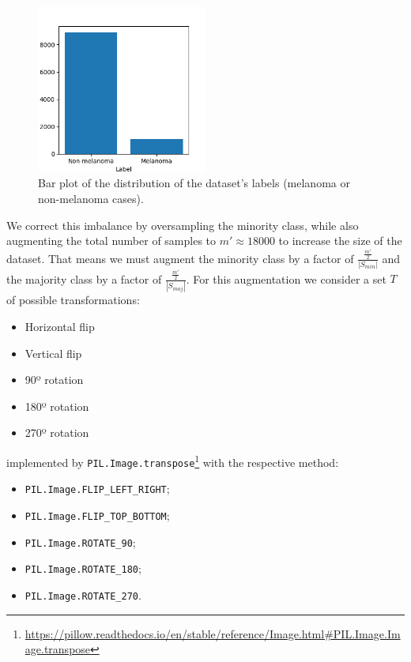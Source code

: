 \begin{figure}[ht]
    \centering
    \includegraphics[width=0.5\textwidth]{figs/data_barplot.png}
    \caption{Bar plot of the distribution of the dataset's labels (melanoma or non-melanoma cases).}
    \label{fig:classimbalance}
\end{figure}

We correct this imbalance by oversampling the minority class, while also augmenting the total number of samples to $m' \approx 18000$ to increase the size of the dataset. That means we must augment the minority class by a factor of $\frac{\frac{m'}{2}}{|S_{min}|}$ and the majority class by a factor of $\frac{\frac{m'}{2}}{|S_{maj}|}$. For this augmentation we consider a set $T$ of possible transformations:

\begin{itemize}
    \item Horizontal flip
    \item Vertical flip
    \item 90º rotation
    \item 180º rotation
    \item 270º rotation
\end{itemize}

implemented by \verb|PIL.Image.transpose|\footnote{\url{https://pillow.readthedocs.io/en/stable/reference/Image.html\#PIL.Image.Image.transpose}} with the respective method:

\begin{itemize}
    \item \verb|PIL.Image.FLIP_LEFT_RIGHT|;
    \item \verb|PIL.Image.FLIP_TOP_BOTTOM|;
    \item \verb|PIL.Image.ROTATE_90|;
    \item \verb|PIL.Image.ROTATE_180|;
    \item \verb|PIL.Image.ROTATE_270|.
\end{itemize}

